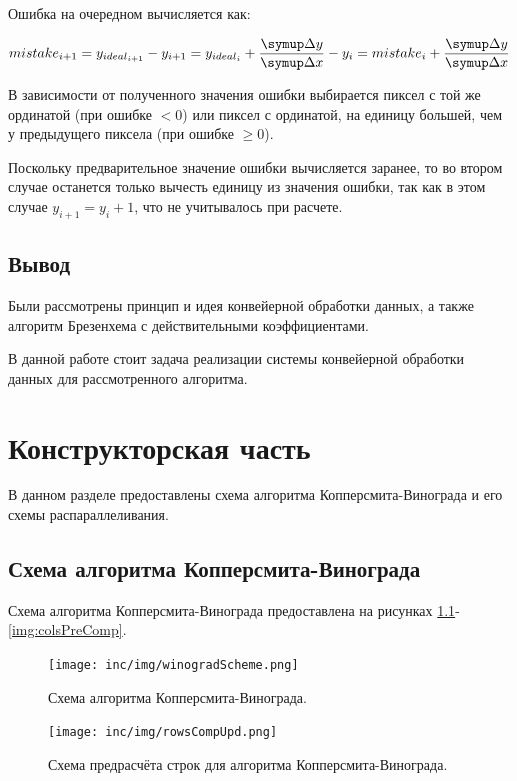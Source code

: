 \documentclass[12pt]{report}
\begin{document}
Ошибка на очередном вычисляется как:

\begin{equation}
\label{1:mistake:2}
	{mistake}_{i + 1} = y_{{ideal}_{i + 1}} - y_{i + 1} = y_{{ideal}_i} + \frac{\symup\Delta y}{\symup\Delta x} - y_i = mistake_i + \frac{\symup\Delta y}{\symup\Delta x}
\end{equation}

В зависимости от полученного значения ошибки выбирается пиксел с той же ординатой (при ошибке $< $0) или пиксел с ординатой, на единицу большей, чем у предыдущего пиксела (при ошибке $\geq0$).

Поскольку предварительное значение ошибки вычисляется заранее, то во втором случае останется только вычесть единицу из значения ошибки, так как в этом случае $y_{i+1}=y_{i} + 1$, что не учитывалось при расчете.

\section*{Вывод}
Были рассмотрены принцип и идея конвейерной обработки данных, а также алгоритм Брезенхема с действительными коэффициентами.

В данной работе стоит задача реализации системы конвейерной обработки данных для рассмотренного алгоритма.

\chapter{Конструкторская часть}
В данном разделе предоставлены схема алгоритма Копперсмита-Винограда и его схемы распараллеливания.
\section{Схема алгоритма Копперсмита-Винограда}
Схема алгоритма Копперсмита-Винограда предоставлена на рисунках \ref{img:winodradScheme}-\ref{img:colsPreComp}.

\begin{figure}
\begin{center}
\texttt{[image: inc/img/winogradScheme.png]}
\captionsetup{justification=centering}
	\caption{Схема алгоритма Копперсмита-Винограда.}
	\label{img:winodradScheme}	
\end{center}
\end{figure}

\begin{figure}
\begin{center}
\texttt{[image: inc/img/rowsCompUpd.png]}
\captionsetup{justification=centering}
	\caption{Схема предрасчёта строк для алгоритма Копперсмита-Винограда.}
	\label{img:rowsPreComp}	
\end{center}
\end{figure}
\end{document}
